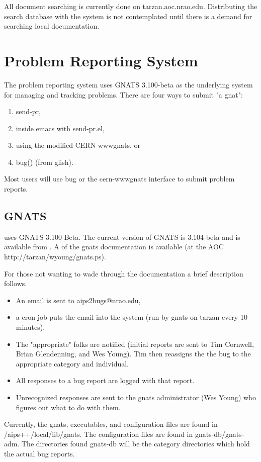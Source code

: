 All document searching is currently done on tarzan.aoc.nrao.edu.  Distributing
the search database with the system is not contemplated until there is a
demand for searching local documentation.

\section{\aips Problem Reporting System}
The \aips problem reporting system uses GNATS 3.100-beta as the underlying
system for managing and tracking problems. There are four ways to submit
"a gnat":
\begin{enumerate}
\item send-pr,
\item inside emacs with send-pr.el, 
\item using the modified CERN wwwgnats, or
\item bug() (from glish).
\end{enumerate} 
Most  users will use bug or the cern-wwwgnats interface to submit problem
reports.
\subsection{GNATS}
\aips uses GNATS 3.100-Beta.  The current version of
GNATS is 3.104-beta and is available from
.
A  of
the gnats documentation is available (at the AOC http://tarzan/wyoung/gnats.ps).

For those not wanting to wade through the documentation a brief
description follows.
\begin{itemize}
\item An email is sent to aips2bugs@nrao.edu,
\item a cron job puts the email into the system (run by gnats on tarzan every
10 minutes),
\item The "appropriate" folks are notified (initial reports are sent to Tim
Cornwell, Brian Glendenning,
and Wes Young). Tim then reassigns the the bug to the appropriate category and
individual.
\item All responses to a bug report are logged with that report.
\item Unrecognized responses are sent to the gnats administrator (Wes Young)
who figures out what to do
with them.
\end{itemize}
Currently, the gnats, executables, and configuration files are found in 
/aips++/local/lib/gnats.  The configuration files are found in
gnats-db/gnats-adm.
The directories found gnats-db will be the category directories which hold the
actual bug reports.
